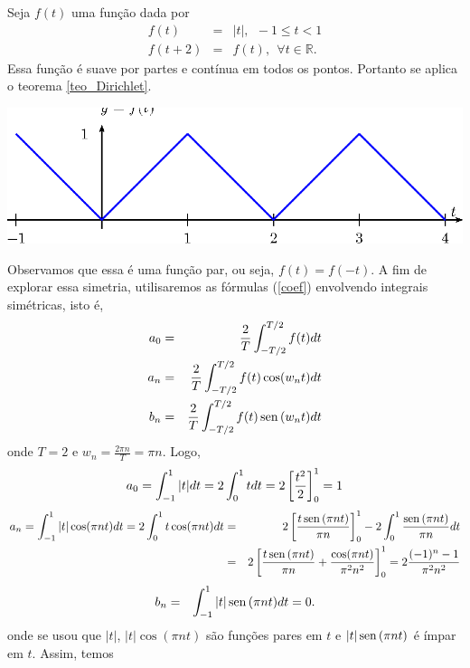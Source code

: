 \begin{ex}\label{ex_triangular} Seja $f(t)$ uma função dada por
\begin{eqnarray*}
f(t)&=&|t|, \ \ -1\leq t<1\\
f(t+2)&=&f(t),\ \ \forall t\in\mathbb{R}.
\end{eqnarray*}
Essa função é suave por partes e contínua em todos os pontos. Portanto se aplica o teorema \ref{teo_Dirichlet}.
\begin{center}

\includegraphics{cap_series/pics/figura_1}\end{center}
Observamos que essa é uma função par, ou seja, $f(t)=f(-t)$. A fim de explorar essa simetria, utilisaremos as fórmulas (\ref{coef}) envolvendo integrais simétricas, isto é,
  \begin{eqnarray*}
   a_0&=& \frac{2}{T}\int_{-T/2}^{T/2} f(t)dt\\
   a_n&=&  \frac{2}{T}\int_{-T/2}^{T/2} f(t)\cos(w_nt)dt\\
   b_n&=&\frac{2}{T}\int_{-T/2}^{T/2} f(t)\operatorname{sen}\,(w_nt)dt
  \end{eqnarray*}
onde $T=2$ e $w_n=\frac{2\pi n}{T}=\pi n$. Logo,
  \begin{equation*}
   a_0= \int_{-1}^{1} |t| dt=2\int_{0}^{1} t dt=2\left[\frac{t^2}{2}\right]_0^1=1\\
	\end{equation*}
	\begin{eqnarray*}
   a_n=  \int_{-1}^{1} |t|\cos(\pi n t)dt=2 \int_{0}^{1} t\cos(\pi n t)dt&=&2\left[\frac{t\operatorname{sen}\,(\pi n t)}{\pi n}\right]_0^1-2\int_0^1\frac{\operatorname{sen}\,(\pi n t)}{\pi n}dt\\
	&=&2\left[\frac{t\operatorname{sen}\,(\pi n t)}{\pi n}+\frac{\cos(\pi n t)}{\pi^2 n^2}\right]_0^1=2\frac{(-1)^n-1}{\pi^2n^2}\\
	 \end{eqnarray*}
	\begin{eqnarray*}
   b_n&=&\int_{-1}^{1} |t|\operatorname{sen}\,(\pi n t)dt=0.
  \end{eqnarray*}
onde se usou que $|t|$, $|t|\cos(\pi n t)$ são funções pares em $t$ e $|t|\operatorname{sen}\,(\pi n t)$ é ímpar em $t$. Assim, temos

\end{ex}
